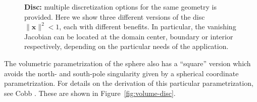 \documentclass[preprint,12pt, a4paper]{elsarticle}
\begin{document}
\begin{figure}
  \begin{center}
    \hspace{.02\linewidth}
    \hspace{.02\linewidth}
    \caption{\textbf{Disc:} multiple discretization options for the same geometry is provided. Here we show three different versions of the disc $\|\mathbf{x}\|^2<1$, each with different benefits. In particular, the vanishing Jacobian can be located at the domain center, boundary or interior respectively, depending on the particular needs of the application.}
    \label{fig:surface-disc}
  \end{center}
\end{figure}

The volumetric parametrization of the sphere also has a ``square'' version which avoids the north- and south-pole singularity given by a spherical coordinate parametrization.
For details on the derivation of this particular parametrization, see Cobb \cite{cobb1988tts}.
These are shown in Figure~\ref{fig:volume-disc}.
\end{document}
